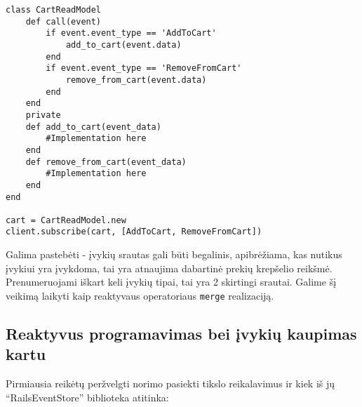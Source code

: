 \begin{lstlisting}
class CartReadModel
    def call(event)
        if event.event_type == 'AddToCart'
            add_to_cart(event.data)
        end
        if event.event_type == 'RemoveFromCart'
            remove_from_cart(event.data)
        end
    end
    private
    def add_to_cart(event_data)
        #Implementation here
    end
    def remove_from_cart(event_data)
        #Implementation here
    end 
end
 
cart = CartReadModel.new
client.subscribe(cart, [AddToCart, RemoveFromCart]) 
\end{lstlisting}

Galima pastebėti - įvykių srautas gali būti begalinis, apibrėžiama, kas nutikus įvykiui yra įvykdoma, tai yra atnaujima dabartinė prekių krepšelio reikšmė. Prenumeruojami iškart keli įvykių tipai, tai yra 2 skirtingi srautai. Galime šį veikimą laikyti kaip reaktyvaus operatoriaus \lstinline|merge| realizaciją.

\subsection{Reaktyvus programavimas bei įvykių kaupimas kartu}

Pirmiausia reikėtų peržvelgti norimo pasiekti tikslo reikalavimus ir kiek iš jų ``RailsEventStore'' biblioteka atitinka:

